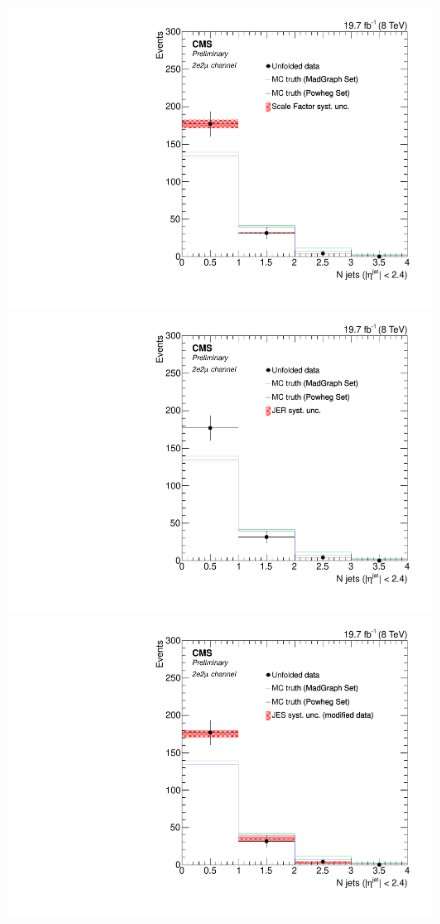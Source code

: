 \begin{figure}[hbtp]
\begin{center}
    \includegraphics[width=0.8\cmsFigWidth]{Figures/Unfolding/Systematics/ZZTo2e2m_CentralJets_SFSq_Mad_fr}
    \includegraphics[width=0.8\cmsFigWidth]{Figures/Unfolding/Systematics/ZZTo2e2m_CentralJets_JER_Mad_fr}
    \includegraphics[width=0.8\cmsFigWidth]{Figures/Unfolding/Systematics/ZZTo2e2m_CentralJets_JES_ModData_Mad_fr}     

\end{center}
\end{figure}
